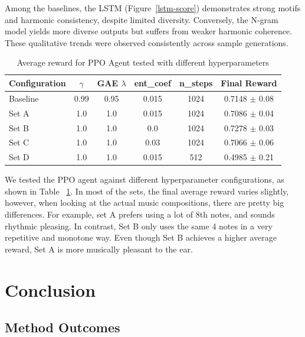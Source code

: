 \documentclass{article}
\begin{document}
Among the baselines, the LSTM (Figure~\ref{lstm-score}) demonstrates strong motifs and harmonic consistency, despite limited diversity. Conversely, the N-gram model yields more diverse outputs but suffers from weaker harmonic coherence. These qualitative trends were observed consistently across sample generations.

\begin{table}[htbp]
    \centering
    \caption{Average reward for PPO Agent tested with different hyperparameters}
    \label{tab:ppo_ablation}
    \begin{tabular}{l c c c c c}
    \toprule
    \textbf{Configuration} & \textbf{$\gamma$} & \textbf{GAE $\lambda$} & \textbf{ent\_coef} & \textbf{n\_steps} & \textbf{Final Reward} \\
    \midrule
    Baseline               & 0.99  & 0.95 & 0.015 & 1024 & 0.7148 $\pm$ 0.08 \\
    Set A                  & 1.0   & 1.0  & 0.015 & 1024 & 0.7086 $\pm$ 0.04 \\
    Set B                  & 1.0   & 1.0  & 0.0   & 1024 & 0.7278 $\pm$ 0.03 \\
    Set C                  & 1.0   & 1.0  & 0.03  & 1024 & 0.7066 $\pm$ 0.06 \\
    Set D                  & 1.0   & 1.0  & 0.015 & 512  & 0.4985 $\pm$ 0.21 \\
    \bottomrule
    \end{tabular}
\end{table}

We tested the PPO agent against different hyperparameter configurations, as shown in Table ~\ref{tab:ppo_ablation}. In most of the sets, the final average reward varies slightly, however, when looking at the actual music compositions, there are pretty big differences. For example, set A prefers using a lot of 8th notes, and sounds rhythmic pleasing. In contrast, Set B only uses the same 4 notes in a very repetitive and monotone way. Even though Set B achieves a higher average reward, Set A is more musically pleasant to the ear.

\section{Conclusion}

\subsection{Method Outcomes}
\end{document}
